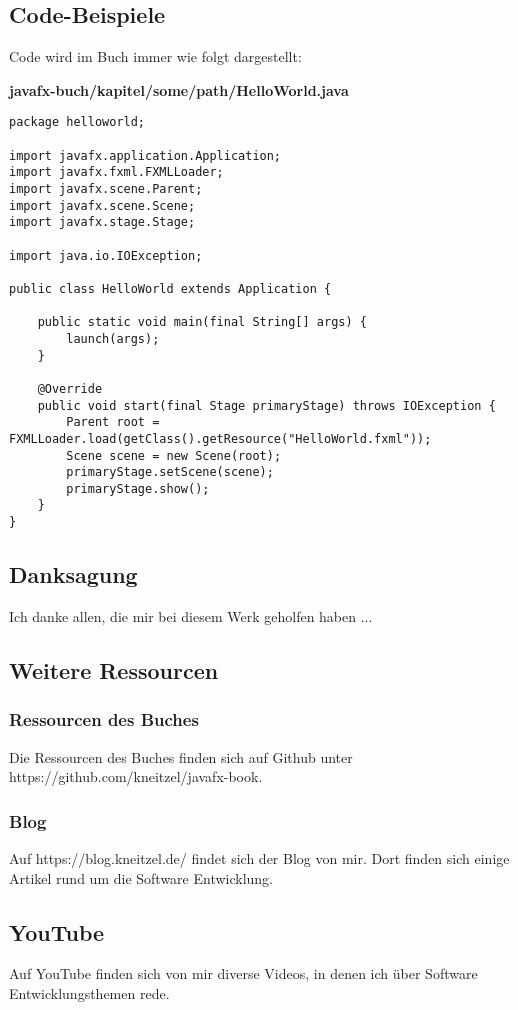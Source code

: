 \subsection{Code-Beispiele}
Code wird im Buch immer wie folgt dargestellt:

\textbf{javafx-buch/kapitel/some/path/HelloWorld.java}
\begin{lstlisting}
package helloworld;

import javafx.application.Application;
import javafx.fxml.FXMLLoader;
import javafx.scene.Parent;
import javafx.scene.Scene;
import javafx.stage.Stage;

import java.io.IOException;

public class HelloWorld extends Application {

    public static void main(final String[] args) {
        launch(args);
    }

    @Override
    public void start(final Stage primaryStage) throws IOException {
        Parent root = FXMLLoader.load(getClass().getResource("HelloWorld.fxml"));
        Scene scene = new Scene(root);
        primaryStage.setScene(scene);
        primaryStage.show();
    }
}
\end{lstlisting}


\subsection{Danksagung}
Ich danke allen, die mir bei diesem Werk geholfen haben ...

\subsection{Weitere Ressourcen}

\subsubsection{Ressourcen des Buches}
Die Ressourcen des Buches finden sich auf Github unter https://github.com/kneitzel/javafx-book.

\subsubsection{Blog}
Auf https://blog.kneitzel.de/ findet sich der Blog von mir. Dort finden sich einige Artikel rund um die Software Entwicklung.

\subsection{YouTube}
Auf YouTube finden sich von mir diverse Videos, in denen ich über Software Entwicklungsthemen rede.

